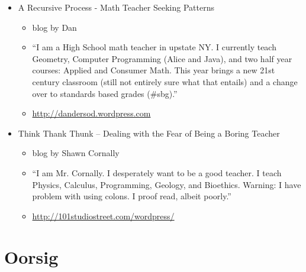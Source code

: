 \begin{itemize}
\item A Recursive Process - Math Teacher Seeking Patterns
\begin{itemize}[noitemsep]
\item blog by Dan
\item “I am a High School math teacher in upstate NY. I currently teach Geometry, Computer Programming (Alice and Java), and two half year courses: Applied and Consumer Math. This year brings a new 21st century classroom (still not entirely sure what that entails) and a change over to standards based grades (#sbg).”
\item \underline{http://dandersod.wordpress.com }
\end{itemize}

\item Think Thank Thunk – Dealing with the Fear of Being a Boring Teacher 
\begin{itemize} [noitemsep]
\item blog by Shawn Cornally
\item “I am Mr. Cornally. I desperately want to be a good teacher. I teach Physics, Calculus, Programming, Geology, and Bioethics. Warning: I have problem with using colons. I proof read, albeit poorly.”
\item \underline{http://101studiostreet.com/wordpress/}
\end{itemize}
\end{itemize}

\section{Oorsig}
